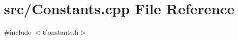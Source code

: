 \section{src/\+Constants.cpp File Reference}
\label{_constants_8cpp}
{\ttfamily \#include $<$Constants.\+h$>$}\newline
